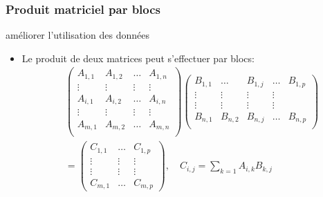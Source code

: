 \begin{frame}
    \frametitle{Produit matriciel par blocs}
\begin{block}{améliorer l'utilisation des données}
    \footnotesize
   \begin{itemize}
    \item<+-> Le produit de deux matrices peut s'effectuer par blocs:
    \begin{equation}
        \label{eq:produit_bloc}
        \begin{split}
         & \begin{pmatrix}
            A_{1,1} & A_{1,2} & \ldots & A_{1,n} \\
            \vdots & \vdots & \vdots & \vdots \\
            A_{i,1} & A_{i,2} & \ldots & A_{i,n} \\
            \vdots & \vdots & \vdots & \vdots \\
            A_{m,1} & A_{m,2} & \ldots & A_{m,n} \\
        \end{pmatrix}
        \begin{pmatrix}
            B_{1,1}  & \ldots & B_{1,j} & \ldots & B_{1,p} \\
            \vdots & \vdots & \vdots & \vdots \\
            \vdots & \vdots & \vdots & \vdots \\
            B_{n,1} & B_{n,2} & B_{n,j} & \ldots & B_{n,p} \\
        \end{pmatrix} \\
        & = \begin{pmatrix}
            C_{1,1} & \ldots & C_{1,p} \\
            \vdots & \vdots & \vdots \\
            \vdots & \vdots & \vdots \\
            C_{m,1} & \ldots & C_{m,p}
        \end{pmatrix}, \quad C_{i,j} = \sum_{k=1} A_{i,k} B_{k,j}
        \end{split}
    \end{equation}
   \end{itemize}
\end{block}
\end{frame}

